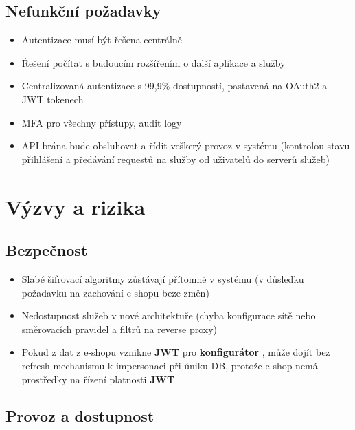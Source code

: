 \documentclass[a4paper,12pt]{article}
\begin{document}
\subsection{Nefunkční požadavky}

\begin{itemize}

\item Autentizace musí být řešena centrálně

\item Řešení počítat s budoucím rozšířením o další aplikace a služby

\item Centralizovaná autentizace s 99,9\% dostupností, pastavená na OAuth2 a JWT tokenech

\item MFA pro všechny přístupy, audit logy

\item API brána bude obsluhovat a řídit veškerý provoz v systému (kontrolou stavu přihlášení a předávání requestů na služby od uživatelů do serverů služeb)

\end{itemize}

\section{Výzvy a rizika}

\subsection{Bezpečnost}

\begin{itemize}

\item Slabé šifrovací algoritmy zůstávají přítomné v systému (v důsledku požadavku na zachování e-shopu beze změn)

\item Nedostupnost služeb v nové architektuře (chyba konfigurace sítě nebo směrovacích pravidel a filtrů na reverse proxy)

\item Pokud z dat z e-shopu vznikne \textbf{JWT}
 pro \textbf{konfigurátor}
, může dojít bez refresh mechanismu k impersonaci při úniku DB, protože e-shop nemá prostředky na řízení platnosti \textbf{JWT}


\end{itemize}

\subsection{Provoz a dostupnost}
\end{document}
